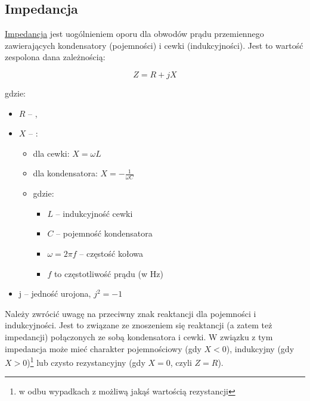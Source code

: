 \subsection{Impedancja}

\href{https://pl.wikipedia.org/wiki/Impedancja}{Impedancja} jest uogólnieniem oporu dla obwodów prądu przemiennego zawierających kondensatory (pojemności) i cewki (indukcyjności). Jest to wartość zespolona dana zależnością:

$$Z = R + jX$$

\noindent
gdzie:
\begin{itemize}
	\item $R$ – ,
	\item $X$ – :
	\begin{itemize}
		\item dla cewki: $X = \omega L$
		\item dla kondensatora: $X = - \frac{1}{\omega C}$
		\item gdzie:
		\begin{itemize}
			\item $L$ – indukcyjność cewki
			\item $C$ – pojemność kondensatora
			\item $\omega = 2 \pi f$ – częstość kołowa
			\item $f$ to częstotliwość prądu (w Hz)
		\end{itemize}
	\end{itemize}
	\item j – jedność urojona, $j^2 = -1$
\end{itemize}

\vspace{5mm}\noindent
Należy zwrócić uwagę na przeciwny znak reaktancji dla pojemności i indukcyjności.
Jest to związane ze znoszeniem się reaktancji (a zatem też impedancji) połączonych ze sobą kondensatora i cewki.
W związku z tym impedancja może mieć charakter pojemnościowy (gdy $X<0$), indukcyjny (gdy $X>0$)\footnote{
	w odbu wypadkach z możliwą jakąś wartością rezystancji
} lub czysto rezystancyjny (gdy $X=0$, czyli $Z=R$).

